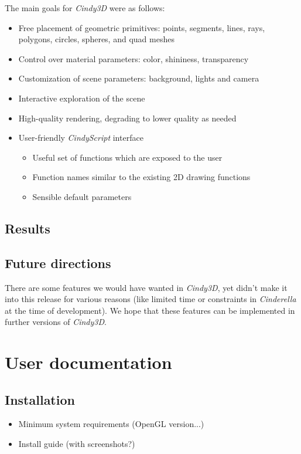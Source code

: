 \documentclass{scrartcl}
\begin{document}
The main goals for \emph{Cindy3D} were as follows:
\begin{itemize}
\item Free placement of geometric primitives: points, segments, 
lines, rays, polygons, circles, spheres, and quad meshes
\item Control over material parameters: color, shininess, transparency
\item Customization of scene parameters: background, lights and camera
\item Interactive exploration of the scene
\item High-quality rendering, degrading to lower quality as needed
\item User-friendly \emph{CindyScript} interface
	\begin{itemize}
	\item Useful set of functions which are exposed to the user
	\item Function names similar to the existing 2D drawing functions
	\item Sensible default parameters
	\end{itemize}
\end{itemize}

\subsection{Results}

\subsection{Future directions}

There are some features we would have wanted in \emph{Cindy3D}, yet didn't make it into this release for various reasons (like limited time or constraints in \emph{Cinderella} at the time of development). We hope that these features can be implemented in further versions of \emph{Cindy3D}.

\section{User documentation}

\subsection{Installation}

\begin{itemize}
\item Minimum system requirements (OpenGL version...)
\item Install guide (with screenshots?)
\end{itemize}
\end{document}
